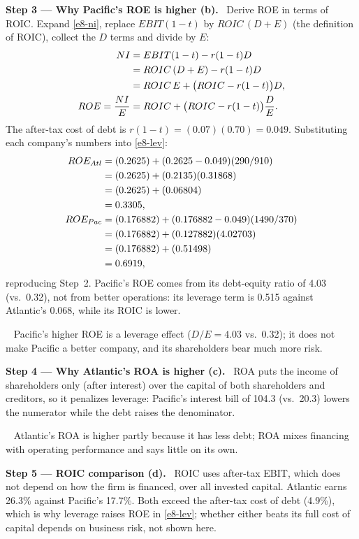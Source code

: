 \documentclass[11pt,a4paper]{article}
\newcommand{\step}[2]{\par\medskip\noindent\textbf{Step #1 --- #2.}~}
\newcommand{\answer}[1]{\par\smallskip\noindent\fbox{\textbf{Answer #1.}}~}
\begin{document}
\step{3}{Why Pacific's ROE is higher (b)}
Derive ROE in terms of ROIC. Expand \eqref{e8-ni}, replace $EBIT(1-t)$ by $ROIC\,(D+E)$ (the
definition of ROIC), collect the $D$ terms and divide by $E$:
\begin{align}
  NI &= EBIT(1-t) - r(1-t)D \notag\\
  &= ROIC\,(D+E) - r(1-t)D \notag\\
  &= ROIC\,E + \bigl(ROIC - r(1-t)\bigr)D, \notag\\
  ROE = \frac{NI}{E} &= ROIC + \bigl(ROIC - r(1-t)\bigr)\frac{D}{E}. \label{e8-lev}
\end{align}
The after-tax cost of debt is $r(1-t) = (0.07)(0.70) = 0.049$. Substituting each company's numbers
into \eqref{e8-lev}:
\begin{align}
  ROE_{Atl} &= (0.2625) + (0.2625 - 0.049)(290/910) \notag\\
  &= (0.2625) + (0.2135)(0.31868) \notag\\
  &= (0.2625) + (0.06804) \notag\\
  &= 0.3305, \notag\\
  ROE_{Pac} &= (0.176882) + (0.176882 - 0.049)(1490/370) \notag\\
  &= (0.176882) + (0.127882)(4.02703) \notag\\
  &= (0.176882) + (0.51498) \notag\\
  &= 0.6919, \notag
\end{align}
reproducing Step~2. Pacific's ROE comes from its debt-equity ratio of 4.03 (vs.\ 0.32), not from
better operations: its leverage term is 0.515 against Atlantic's 0.068, while its ROIC is lower.

\answer{(b)} Pacific's higher ROE is a leverage effect ($D/E = 4.03$ vs.\ 0.32); it does not make
Pacific a better company, and its shareholders bear much more risk.

\step{4}{Why Atlantic's ROA is higher (c)}
ROA puts the income of shareholders only (after interest) over the capital of both shareholders and
creditors, so it penalizes leverage: Pacific's interest bill of 104.3 (vs.\ 20.3) lowers the
numerator while the debt raises the denominator.

\answer{(c)} Atlantic's ROA is higher partly because it has less debt; ROA mixes financing with
operating performance and says little on its own.

\step{5}{ROIC comparison (d)}
ROIC uses after-tax EBIT, which does not depend on how the firm is financed, over all invested
capital. Atlantic earns 26.3\% against Pacific's 17.7\%. Both exceed the after-tax cost of debt
(4.9\%), which is why leverage raises ROE in \eqref{e8-lev}; whether either beats its full cost of
capital depends on business risk, not shown here.
\end{document}
